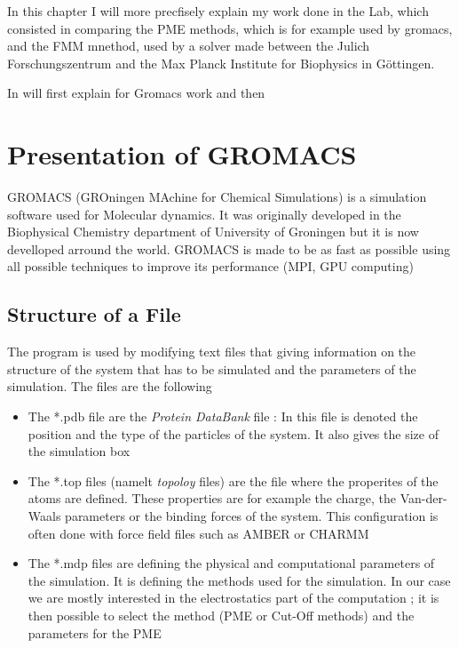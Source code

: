 \documentclass[11pt,twoside,a4paper]{report}
\begin{document}
    In this chapter I will more precfisely explain my work done in the Lab, which consisted in comparing the PME methods, which is for example used by gromacs, and the FMM mnethod, used by a solver made between the Julich Forschungszentrum and the Max Planck Institute for Biophysics in Göttingen.

    In will first explain for Gromacs work and then 


\section{Presentation of GROMACS}

    GROMACS (GROningen MAchine for Chemical Simulations) is a simulation software used for Molecular dynamics. It was originally developed in the Biophysical Chemistry department of University of Groningen but it is now develloped arround the world. GROMACS is made to be as fast as possible using all possible techniques to improve its performance (MPI, GPU computing) 
    
   
	\subsection{Structure of a File}
	
	 The program is used  by modifying text files that giving information on the structure of the system that has to be simulated and the parameters of the simulation. The files are the following 
	 
	\begin{itemize}
	
	\item The *.pdb file are the \textit{Protein DataBank} file : In this file is denoted the position and the type of the particles of the system. It also gives the size of the simulation box

	\item The *.top files (namelt \textit{topoloy} files) are the file where the properites of the atoms are defined. These properties are for example the charge, the Van-der-Waals parameters or the binding forces of the system. This configuration is often done with force field files such as AMBER or CHARMM
		 
	\item The *.mdp files are defining the physical and computational parameters of the simulation. It is defining the methods used for the simulation. In our case we are mostly interested in the electrostatics part of the computation ; it is then possible to select the method (PME or Cut-Off methods) and the parameters for the PME
	
	\end{itemize}
		
\end{document}
